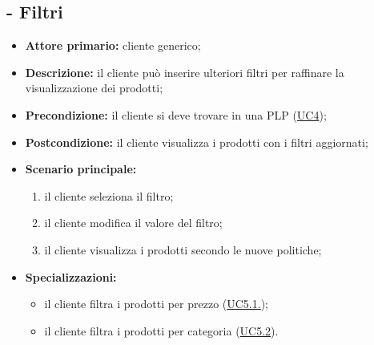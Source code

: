 \subsection{ - Filtri}
\begin{itemize}
    \item \textbf{Attore primario:} cliente generico;
    \item \textbf{Descrizione:} il cliente può inserire ulteriori filtri per raffinare la visualizzazione dei prodotti;
    \item \textbf{Precondizione:} il cliente si deve trovare in una PLP (\hyperref[UC4]{UC4});
    \item \textbf{Postcondizione:} il cliente visualizza i prodotti con i filtri aggiornati;
    \item \textbf{Scenario principale:}
          \begin{enumerate}
              \item il cliente seleziona il filtro;
              \item il cliente modifica il valore del filtro;
              \item il cliente visualizza i prodotti secondo le nuove politiche;
          \end{enumerate}
    \item \textbf{Specializzazioni: }
          \begin{itemize}
              \item il cliente filtra i prodotti per prezzo (\hyperref[UC5.1]{UC5.1.});
              \item il cliente filtra i prodotti per categoria (\hyperref[UC5.2]{UC5.2}).
          \end{itemize}
\end{itemize}

\stepsubUserCase
